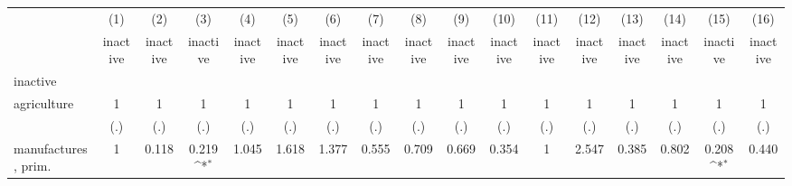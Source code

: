 {
\def\sym#1{\ifmmode^{#1}\else\(^{#1}\)\fi}
\begin{tabular}{l*{16}{c}}
\hline\hline
                    &\multicolumn{1}{c}{(1)}&\multicolumn{1}{c}{(2)}&\multicolumn{1}{c}{(3)}&\multicolumn{1}{c}{(4)}&\multicolumn{1}{c}{(5)}&\multicolumn{1}{c}{(6)}&\multicolumn{1}{c}{(7)}&\multicolumn{1}{c}{(8)}&\multicolumn{1}{c}{(9)}&\multicolumn{1}{c}{(10)}&\multicolumn{1}{c}{(11)}&\multicolumn{1}{c}{(12)}&\multicolumn{1}{c}{(13)}&\multicolumn{1}{c}{(14)}&\multicolumn{1}{c}{(15)}&\multicolumn{1}{c}{(16)}\\
                    &\multicolumn{1}{c}{inactive}&\multicolumn{1}{c}{inactive}&\multicolumn{1}{c}{inactive}&\multicolumn{1}{c}{inactive}&\multicolumn{1}{c}{inactive}&\multicolumn{1}{c}{inactive}&\multicolumn{1}{c}{inactive}&\multicolumn{1}{c}{inactive}&\multicolumn{1}{c}{inactive}&\multicolumn{1}{c}{inactive}&\multicolumn{1}{c}{inactive}&\multicolumn{1}{c}{inactive}&\multicolumn{1}{c}{inactive}&\multicolumn{1}{c}{inactive}&\multicolumn{1}{c}{inactive}&\multicolumn{1}{c}{inactive}\\
\hline
inactive            &                     &                     &                     &                     &                     &                     &                     &                     &                     &                     &                     &                     &                     &                     &                     &                     \\
agriculture         &           1         &           1         &           1         &           1         &           1         &           1         &           1         &           1         &           1         &           1         &           1         &           1         &           1         &           1         &           1         &           1         \\
                    &         (.)         &         (.)         &         (.)         &         (.)         &         (.)         &         (.)         &         (.)         &         (.)         &         (.)         &         (.)         &         (.)         &         (.)         &         (.)         &         (.)         &         (.)         &         (.)         \\
[1em]
manufactures, prim. &           1         &       0.118         &       0.219\sym{*}  &       1.045         &       1.618         &       1.377         &       0.555         &       0.709         &       0.669         &       0.354         &           1         &       2.547         &       0.385         &       0.802         &       0.208\sym{*}  &       0.440         \\

\end{tabular}}
